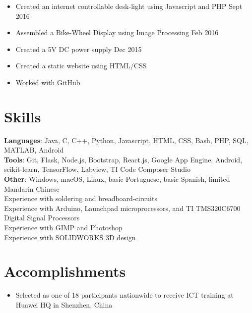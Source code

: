 \documentclass{resume}
\begin{document}
\begin{itemize}
    \item Created an internet controllable desk-light using Javascript and PHP	\hfill Sept 2016
    \item Assembled a Bike-Wheel Display using Image Processing \hfill Feb 2016
    \item Created a 5V DC power supply \hfill Dec 2015
\end{itemize}
\begin{itemize}
    \item Created a static website using HTML/CSS
    \item Worked with GitHub
\end{itemize}

\section{Skills}
\textbf{Languages}: Java, C, C++, Python, Javascript, HTML, CSS, Bash, PHP, SQL, MATLAB, Android \\
\textbf{Tools}: Git, Flask, Node.js, Bootstrap, React.js, Google App Engine, Android, scikit-learn, TensorFlow, Labview, TI Code Composer Studio \\
\textbf{Other}: Windows, macOS, Linux, basic Portuguese, basic Spanish, limited Mandarin Chinese \\
Experience with soldering and breadboard-circuits \\
Experience with Arduino, Launchpad microprocessors, and TI TMS320C6700 Digital Signal Processors \\
Experience with GIMP and Photoshop \\
Experience with SOLIDWORKS 3D design \\

\section{Accomplishments}
\begin{itemize}[topsep=0pt]
    \item Selected as one of 18 participants nationwide to receive ICT training at Huawei HQ in Shenzhen, China
\end{itemize}
\end{document}
